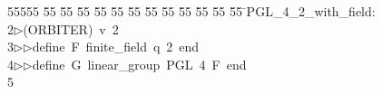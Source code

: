 %
%
\begin{tabbing}
55555 \= 55 \= 55 \= 55 \= 55 \= 55 \= 55 \= 55 \= 55 \= 55 \= 55 \= 55 \= 55 \= \>PGL\_4\_2\_with\_field:\\[0pt]
2\>$\triangleright$\>(ORBITER)\ v\ 2\ \\[0pt]
3\>$\triangleright$\>$\triangleright$\>define\ F\ finite\_field\ q\ 2\ end\ \\[0pt]
4\>$\triangleright$\>$\triangleright$\>define\ G\ linear\_group\ PGL\ 4\ F\ end\\[0pt]
5\>\end{tabbing}
